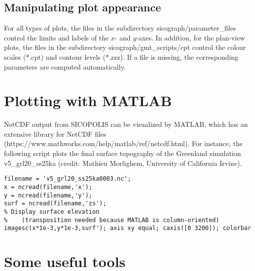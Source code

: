 \documentclass[12pt,a4paper]{article}
\begin{document}
\subsection{Manipulating plot appearance}

For all types of plots, the files in the subdirectory sicograph/parameter\_files control the limits and labels of the $x$- and $y$-axes. In addition, for the plan-view plots, the files in the subdirectory sicograph/gmt\_scripts/cpt control the colour scales (*.cpt) and contour levels (*.zzz). If a file is missing, the corresponding parameters are computed automatically.


\section{Plotting with MATLAB}
\label{sect_matlab}

NetCDF output from SICOPOLIS can be visualized by MATLAB, which has an extensive library for NetCDF files (https://www.mathworks.com/help/matlab/ref/netcdf.html). For instance, the following script plots the final surface topography of the Greenland simulation v5\_grl20\_ss25ka (credit: Mathieu Morlighem, University of California Irvine).

\vspace*{2ex}

\noindent\hspace*{5mm}\verb+filename = 'v5_grl20_ss25ka0003.nc';+
\\[-0.5ex]
\hspace*{5mm}\verb+x = ncread(filename,'x');+
\\[-0.5ex]
\hspace*{5mm}\verb+y = ncread(filename,'y');+
\\[-0.5ex]
\hspace*{5mm}\verb+surf = ncread(filename,'zs');+
\\[-0.5ex]
\hspace*{5mm}\verb+% Display surface elevation+
\\[-0.5ex]
\hspace*{5mm}\verb+%    (transposition needed because MATLAB is column-oriented)+
\\[-0.5ex]
\hspace*{5mm}\verb+imagesc(x*1e-3,y*1e-3,surf'); axis xy equal; caxis([0 3200]); colorbar+



\section{Some useful tools}
\label{sect_tools}
\end{document}
